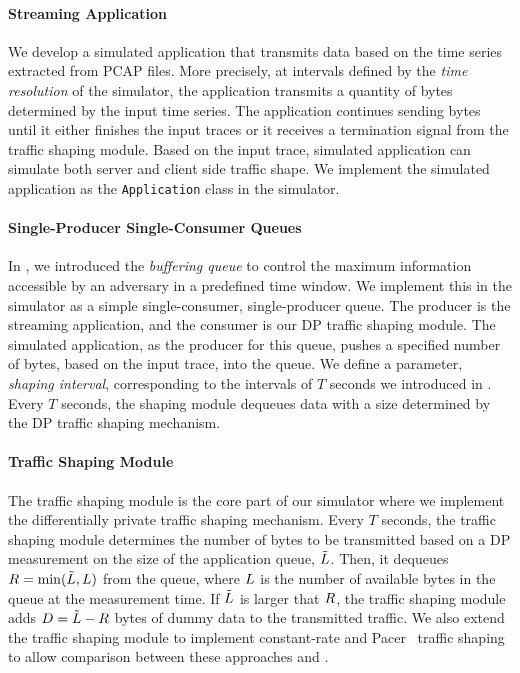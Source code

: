 \paragraph{Streaming Application}\label{subsubsec:design-simulator-app}
We develop a simulated application that transmits data based on the time series extracted from PCAP files. 
More precisely, at intervals defined by the \emph{time resolution} of the simulator, the application transmits a quantity of bytes determined by the input time series.
The application continues sending bytes until it either finishes the input traces or it receives a termination signal from the traffic shaping module.
Based on the input trace, simulated application can simulate both server and client side traffic shape.
We implement the simulated application as the \texttt{Application} class in the simulator.

\paragraph{Single-Producer Single-Consumer Queues}\label{subsubsec:design-sim-spsc-queue}
In , we introduced the \textit{buffering queue} to control the maximum information accessible by an adversary in a predefined time window.
We implement this in the simulator as a simple single-consumer, single-producer queue.
The producer is the streaming application, and
the consumer is our DP traffic shaping module.
The simulated application, as the producer for this queue, pushes a specified number of bytes, based on the input trace, into the queue.
We define a parameter, \emph{shaping interval}, corresponding to the intervals of $T$ seconds we introduced in .
Every $T$ seconds, the shaping module dequeues data with a size determined by
the DP traffic shaping mechanism.



\paragraph{Traffic Shaping Module}
The traffic shaping module is the core part of our simulator where we implement the differentially private traffic shaping mechanism.
Every $T$ seconds, the traffic shaping module determines the number of bytes to be transmitted based on a DP measurement on the size of the application queue, $\tilde{L}$.
Then, it dequeues $R = \min(\tilde{L}, L)$ from the queue, where $L$ is the number of available bytes in the queue at the measurement time. 
If $\tilde{L}$ is larger that $R$, the traffic shaping module adds $D = \tilde{L} - R$ bytes of dummy data to the transmitted traffic.
We also extend the traffic shaping module to implement constant-rate and Pacer~\cite{mehta2022pacer} traffic shaping to allow comparison between these approaches and {\sys}. 

